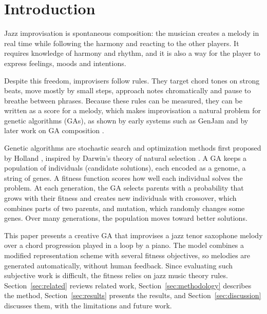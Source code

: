 \section{Introduction}\label{sec:introduction}

Jazz improvisation is spontaneous composition: the musician creates a melody in real time while following the harmony and reacting to the other players. It requires knowledge of harmony and rhythm, and it is also a way for the player to express feelings, moods and intentions.

Despite this freedom, improvisers follow rules. They target chord tones on strong beats, move mostly by small steps, approach notes chromatically and pause to breathe between phrases. Because these rules can be measured, they can be written as a score for a melody, which makes improvisation a natural problem for genetic algorithms (GAs), as shown by early systems such as GenJam \cite{biles1994} and by later work on GA composition \cite{papadopoulos1998}.

Genetic algorithms are stochastic search and optimization methods first proposed by Holland \cite{holland1975}, inspired by Darwin's theory of natural selection \cite{darwin1859}. A GA keeps a population of individuals (candidate solutions), each encoded as a genome, a string of genes. A fitness function scores how well each individual solves the problem. At each generation, the GA selects parents with a probability that grows with their fitness and creates new individuals with crossover, which combines parts of two parents, and mutation, which randomly changes some genes. Over many generations, the population moves toward better solutions.

This paper presents a creative GA that improvises a jazz tenor saxophone melody over a chord progression played in a loop by a piano. The model combines a modified representation scheme with several fitness objectives, so melodies are generated automatically, without human feedback. Since evaluating such subjective work is difficult, the fitness relies on jazz music theory rules. Section~\ref{sec:related} reviews related work, Section~\ref{sec:methodology} describes the method, Section~\ref{sec:results} presents the results, and Section~\ref{sec:discussion} discusses them, with the limitations and future work.
